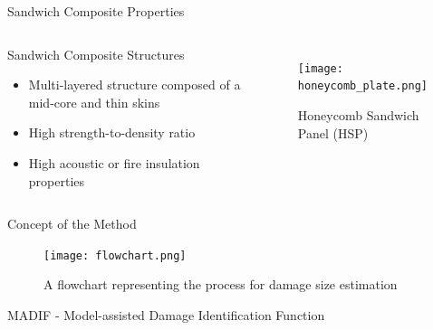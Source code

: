 \documentclass[10pt,aspectratio=169]{beamer} %
\begin{document}
	\begin{frame}[label=frame2]{Sandwich Composite Properties}

	\begin{columns}[T]


		\begin{block}{Sandwich Composite Structures}

			\begin{itemize}

				\item Multi-layered structure composed of a mid-core and thin skins

				\item High strength-to-density ratio

				\item High acoustic or fire insulation properties

			\end{itemize}

		\end{block}


		\begin{figure}

			\texttt{[image: honeycomb\_plate.png]}

			\caption{Honeycomb Sandwich Panel (HSP)}

		\end{figure}

	\end{columns}

\end{frame}

\begin{frame}[label=frame6]{Concept of the Method}
\begin{figure}
	\texttt{[image: flowchart.png]}
	\caption{A flowchart representing the process for damage size estimation}
\end{figure}
MADIF - Model-assisted Damage Identification Function
\end{frame}
\end{document}
